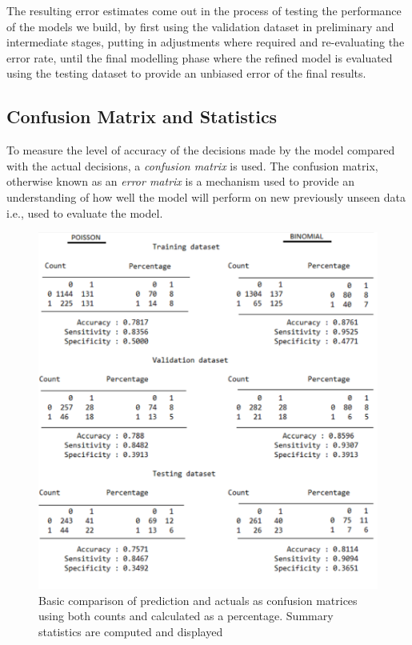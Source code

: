 \documentclass{DissertateUSU}
\begin{document}
The resulting error estimates come out in the process of testing the
performance of the models we build, by first using the validation
dataset in preliminary and intermediate stages, putting in adjustments
where required and re-evaluating the error rate, until the final
modelling phase where the refined model is evaluated using the testing
dataset to provide an unbiased error of the final results. \medskip

\singlespacing

\doublespacing

\subsection{Confusion Matrix and Statistics}

To measure the level of accuracy of the decisions made by the model
compared with the actual decisions, a \emph{confusion matrix} is used.
The confusion matrix, otherwise known as an \emph{error matrix} is a
mechanism used to provide an understanding of how well the model will
perform on new previously unseen data i.e., used to evaluate the model.

\begin{figure}
\centering
\includegraphics[scale=1.0]{ConfusionMatrix}
\caption[Confusion (Error) matrices]{Basic comparison of prediction and actuals as confusion matrices using both counts and calculated as a percentage. Summary statistics are computed and displayed}
\label{ConfusionMatricesAll}
\end{figure}
\end{document}
